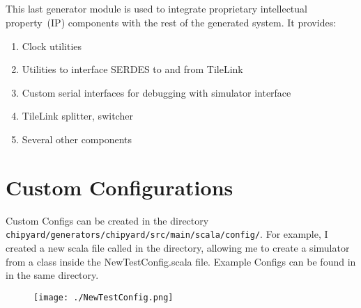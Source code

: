 \subsection{}\label{sec:testchipip}
\nocite{testchipipGithub}
This last generator module is used to integrate proprietary intellectual property~(IP) components with the rest of the generated system.
It provides:
\begin{enumerate}
\item Clock utilities
\item Utilities to interface SERDES to and from TileLink
\item Custom serial interfaces for debugging with simulator interface
\item TileLink splitter, switcher
\item Several other components
\end{enumerate}

\section{Custom Configurations}\label{sec:Custom_Configurations}
Custom Configs can be created in the directory \texttt{chipyard/generators/chipyard/src/main/scala/config/}.
For example, I created a new scala file called  in the directory, allowing me to create a simulator from a class inside the NewTestConfig.scala file.
Example Configs can be found in   in the same directory.

\begin{figure}[h!tbp]
  \centering
  \texttt{[image: ./NewTestConfig.png]}
  \caption{}
  \label{fig:newtestconfig}
\end{figure}

